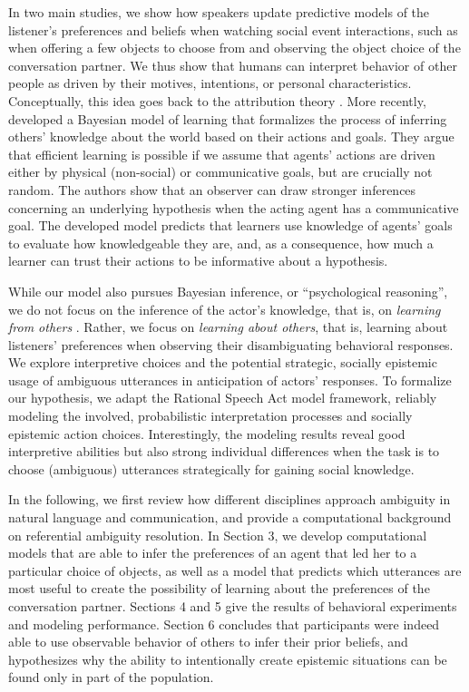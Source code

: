 \documentclass[11pt,a4paper]{article}
\begin{document}
In two main studies, we show how speakers update predictive models of the listener's preferences and beliefs when watching social event interactions, such as when offering a few objects to choose from and observing the object choice of the conversation partner. 
We thus show that humans can interpret behavior of other people as driven by their motives, intentions, or personal characteristics.
Conceptually, this idea goes back to the attribution theory \cite{jones1965acts, kelley1967attribution, kelley1970social}.
More recently,  developed a Bayesian model of learning that formalizes the process of inferring others' knowledge about the world based on their actions and goals. They argue that efficient learning is possible if we assume that agents' actions are driven either by physical (non-social) or communicative goals, but are crucially not random. The authors show that an observer can draw stronger inferences concerning an underlying hypothesis when the acting agent has a communicative goal.
The developed model predicts that learners use knowledge of agents' goals to evaluate how knowledgeable they are, and, as a consequence, how much a learner can trust their actions to be informative about a hypothesis.
 

While our model also pursues Bayesian inference, or ``psychological reasoning'', we do not focus on the inference of the actor's knowledge, that is, on \emph{learning from others} \cite{shafto2012learning}.
Rather, we focus on \emph{learning about others}, that is, learning about listeners' preferences when observing their disambiguating behavioral responses.
We explore interpretive choices and the potential strategic, socially epistemic usage of ambiguous utterances in anticipation of actors' responses. 
To formalize our hypothesis, we adapt the Rational Speech Act model framework, reliably modeling the involved, probabilistic interpretation processes and socially epistemic action choices. 
Interestingly, the modeling results reveal good interpretive abilities but also strong individual differences when the task is to choose (ambiguous) utterances strategically for gaining social knowledge. 

In the following, we first review how different disciplines approach ambiguity in natural language and communication, and provide a computational background on referential ambiguity resolution. 
In Section 3, we develop computational models that are able to infer the preferences of an agent that led her to a particular choice of objects, as well as a model that predicts which utterances are most useful to create the possibility of learning about the preferences of the conversation partner. 
Sections 4 and 5 give the results of behavioral experiments and modeling performance. 
Section 6 concludes that participants were indeed able to use observable behavior of others to infer their prior beliefs, and hypothesizes why the ability to intentionally create epistemic situations can be found only in part of the population.
\end{document}
